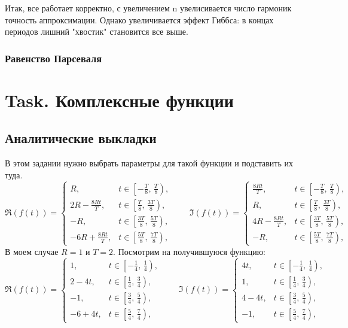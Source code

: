 \documentclass[a4paper,12pt]{article}
\begin{document}
Итак, все работает корректно, с увеличением n увелисивается число гармоник  точность аппроксимации. Однако увеличивается эффект Гиббса: в концах периодов лишний "хвостик" становится все выше.
\subsubsection{Равенство Парсеваля}


\section{Task. Комплексные функции}

\subsection{Аналитические выкладки}
В этом задании нужно выбрать параметры для такой функции и подставить их туда. 
\[
\Re(f(t)) =
\begin{cases}
R, & t \in \left[-\frac{T}{8},\,\frac{T}{8}\right), \\
2R - \frac{8Rt}{T}, & t \in \left[\frac{T}{8},\,\frac{3T}{8}\right), \\
-R, & t \in \left[\frac{3T}{8},\,\frac{5T}{8}\right), \\
-6R + \frac{8Rt}{T}, & t \in \left[\frac{5T}{8},\,\frac{7T}{8}\right),
\end{cases}
\qquad
\Im(f(t)) =
\begin{cases}
\frac{8Rt}{T}, & t \in \left[-\frac{T}{8},\,\frac{T}{8}\right), \\
R, & t \in \left[\frac{T}{8},\,\frac{3T}{8}\right), \\
4R - \frac{8Rt}{T}, & t \in \left[\frac{3T}{8},\,\frac{5T}{8}\right), \\
-R, & t \in \left[\frac{5T}{8},\,\frac{7T}{8}\right),
\end{cases}
\]
В моем случае \(R = 1\) и \(T = 2\). Посмотрим на получившуюся функцию:
\[
\Re(f(t)) =
\begin{cases}
1, & t \in \left[-\frac{1}{4},\,\frac{1}{4}\right), \\
2 - 4t, & t \in \left[\frac{1}{4},\,\frac{3}{4}\right), \\
-1, & t \in \left[\frac{3}{4},\,\frac{5}{4}\right), \\
-6 + 4t, & t \in \left[\frac{5}{4},\,\frac{7}{4}\right),
\end{cases}
\qquad
\Im(f(t)) =
\begin{cases}
4t, & t \in \left[-\frac{1}{4},\,\frac{1}{4}\right), \\
1, & t \in \left[\frac{1}{4},\,\frac{3}{4}\right), \\
4 - 4t, & t \in \left[\frac{3}{4},\,\frac{5}{4}\right), \\
-1, & t \in \left[\frac{5}{4},\,\frac{7}{4}\right),
\end{cases}
\]
\end{document}
